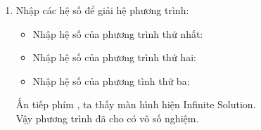 \begin{vd}
{\begin{enumerate}
\begin{itemize}
	\item Nhập hệ số của phương trình thứ hai: \fbox{$-$}  \fbox{$=$}  \fbox{$=$}  \fbox{$=$}  \fbox{$=$}
	\item Nhập hệ số của phương tình thứ ba:  \fbox{$=$}  \fbox{$=$} \fbox{$-$}  \fbox{$=$}  \fbox{$=$} 
\end{itemize}
Ấn tiếp phím \fbox{$=$}, ta thấy màn hình hiện No Solution.\\
Vậy phương trình đã cho vô nghiệm.
\item Nhập các hệ số để giải hệ phương trình:
	\begin{itemize}
	\item Nhập hệ số của phương trình thứ nhất:  \fbox{$=$}  \fbox{$=$} \fbox{$-$}  \fbox{$=$}   \fbox{$=$}
	\item Nhập hệ số của phương trình thứ hai:  \fbox{$=$}  \fbox{$=$} \fbox{$-$}  \fbox{$=$}  \fbox{$=$}
	\item Nhập hệ số của phương tình thứ ba:  \fbox{$=$} \fbox{$-$}  \fbox{$=$} \fbox{$-$}  \fbox{$=$} \fbox{$-$}  \fbox{$=$}
\end{itemize}
Ấn tiếp phím \fbox{$=$}, ta thấy màn hình hiện Infinite Solution.\\
Vậy phương trình đã cho có vô số nghiệm.
\end{enumerate}
}
\end{vd}
